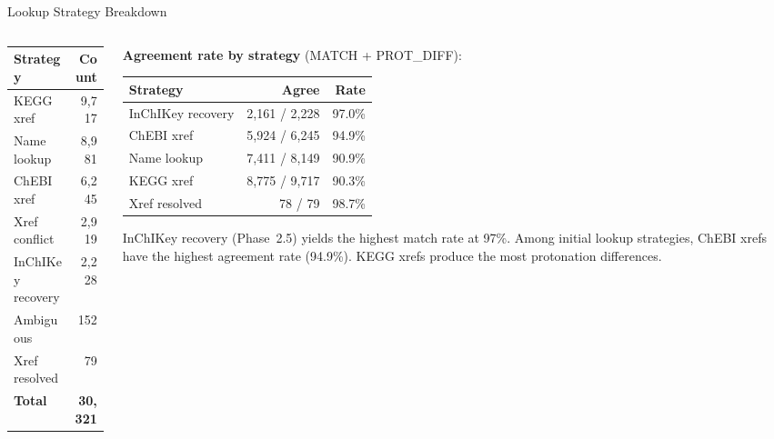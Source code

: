 \documentclass[aspectratio=169,11pt]{beamer}
\begin{document}
\begin{frame}{Lookup Strategy Breakdown}

\begin{columns}[T]
\begin{column}{0.45\textwidth}
\begin{table}[h]
\centering
\begin{tabular}{lr}
\toprule
\textbf{Strategy} & \textbf{Count} \\
\midrule
KEGG xref          &  9,717 \\
Name lookup        &  8,981 \\
ChEBI xref         &  6,245 \\
Xref conflict      &  2,919 \\
InChIKey recovery  &  2,228 \\
Ambiguous          &    152 \\
Xref resolved      &     79 \\
\midrule
\textbf{Total}     & \textbf{30,321} \\
\bottomrule
\end{tabular}
\end{table}
\end{column}

\begin{column}{0.50\textwidth}
\textbf{Agreement rate by strategy} (MATCH + PROT\_DIFF):
\begin{table}[h]
\centering
\footnotesize
\begin{tabular}{lrr}
\toprule
\textbf{Strategy} & \textbf{Agree} & \textbf{Rate} \\
\midrule
InChIKey recovery & 2,161 / 2,228  & 97.0\% \\
ChEBI xref        & 5,924 / 6,245  & 94.9\% \\
Name lookup       & 7,411 / 8,149  & 90.9\% \\
KEGG xref         & 8,775 / 9,717  & 90.3\% \\
Xref resolved     &    78 / 79     & 98.7\% \\
\bottomrule
\end{tabular}
\end{table}

\bigskip
\footnotesize
InChIKey recovery (Phase~2.5) yields the highest match rate at 97\%.
Among initial lookup strategies, ChEBI xrefs have the highest
agreement rate (94.9\%). KEGG xrefs produce the most protonation differences.
\end{column}
\end{columns}

\end{frame}
\end{document}
